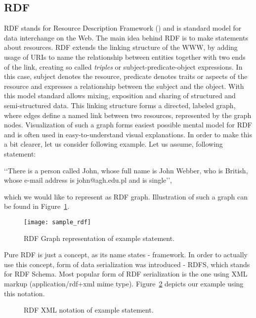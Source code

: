 \subsection{RDF}

RDF stands for Resource Description Framework (\cite{rdfPrimer:2004}) and is standard model for data interchange on the Web. The main idea behind RDF is to make statements about resources. RDF extends the linking structure of the WWW, by adding usage of URIs to name the relationship between entities together with two ends of the link, creating so called \emph{triples} or subject-predicate-object expressions. In this case, subject denotes the resource, predicate denotes traits or aspects of the resource and expresses a relationship between the subject and the object. With this model standard allows mixing, exposition and sharing of structured and semi-structured data.
This linking structure forms a directed, labeled graph, where edges define a named link between two resources, represented by the graph nodes. Visualization of such a graph forms easiest possible mental model for RDF and is often used in easy-to-understand visual explanations.
In order to make this a bit clearer, let us consider following example. Let us assume, following statement:

\lq\lq{}There is a person called John, whose full name is John Webber, who is British, whose e-mail address is john@agh.edu.pl and is single\rq\rq{}, 

which we would like to represent as RDF graph. Illustration of such a graph can be found in Figure~\ref{fig:sample_rdf}.

\begin{figure}[ht]
	\centering
	\texttt{[image: sample\_rdf]}
	\caption{RDF Graph representation of example statement.}
	\label{fig:sample_rdf}
\end{figure}

Pure RDF is just a concept, as its name states - framework. In order to actually use this concept, form of data serialization was introduced - RDFS, which stands for RDF Schema\cite{rdfRef:2004}. Most popular form of RDF serialization is the one using XML markup (application/rdf+xml mime type). Figure~\ref{fig:sample_rdf_xml} depicts our example using this notation.

\begin{figure}[ht]
	\centering
	
	\caption{RDF XML notation of example statement.}
	\label{fig:sample_rdf_xml}
\end{figure}

